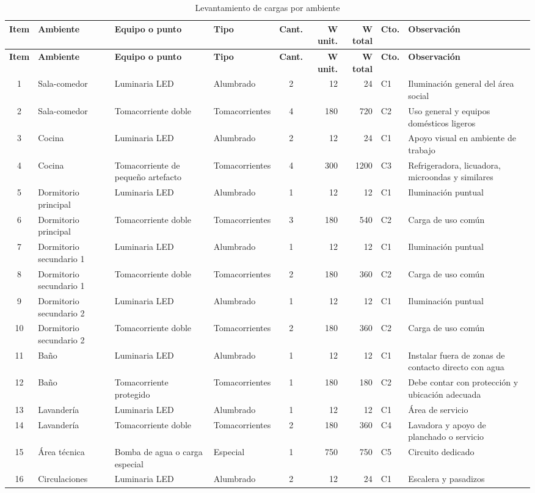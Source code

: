 \begin{landscape}
\scriptsize
\setlength{\tabcolsep}{3pt}
\begin{longtable}{c L{2.3cm} L{2.6cm} L{2.2cm} c r r L{1.0cm} L{2.4cm}}
\caption{Levantamiento de cargas por ambiente}\label{tab:levantamiento-cargas}\\
\toprule
\textbf{Item} & \textbf{Ambiente} & \textbf{Equipo o punto} & \textbf{Tipo} & \textbf{Cant.} & \textbf{W unit.} & \textbf{W total} & \textbf{Cto.} & \textbf{Observación} \\
\midrule
\endfirsthead
\toprule
\textbf{Item} & \textbf{Ambiente} & \textbf{Equipo o punto} & \textbf{Tipo} & \textbf{Cant.} & \textbf{W unit.} & \textbf{W total} & \textbf{Cto.} & \textbf{Observación} \\
\midrule
{} & Sala-comedor & Luminaria LED & Alumbrado & 2 & 12 & 24 & C1 & Iluminación general del área social \\
2 & Sala-comedor & Tomacorriente doble & Tomacorrientes & 4 & 180 & 720 & C2 & Uso general y equipos domésticos ligeros \\
3 & Cocina & Luminaria LED & Alumbrado & 2 & 12 & 24 & C1 & Apoyo visual en ambiente de trabajo \\
4 & Cocina & Tomacorriente de pequeño artefacto & Tomacorrientes & 4 & 300 & 1200 & C3 & Refrigeradora, licuadora, microondas y similares \\
5 & Dormitorio principal & Luminaria LED & Alumbrado & 1 & 12 & 12 & C1 & Iluminación puntual \\
6 & Dormitorio principal & Tomacorriente doble & Tomacorrientes & 3 & 180 & 540 & C2 & Carga de uso común \\
7 & Dormitorio secundario 1 & Luminaria LED & Alumbrado & 1 & 12 & 12 & C1 & Iluminación puntual \\
8 & Dormitorio secundario 1 & Tomacorriente doble & Tomacorrientes & 2 & 180 & 360 & C2 & Carga de uso común \\
9 & Dormitorio secundario 2 & Luminaria LED & Alumbrado & 1 & 12 & 12 & C1 & Iluminación puntual \\
10 & Dormitorio secundario 2 & Tomacorriente doble & Tomacorrientes & 2 & 180 & 360 & C2 & Carga de uso común \\
11 & Baño & Luminaria LED & Alumbrado & 1 & 12 & 12 & C1 & Instalar fuera de zonas de contacto directo con agua \\
12 & Baño & Tomacorriente protegido & Tomacorrientes & 1 & 180 & 180 & C2 & Debe contar con protección y ubicación adecuada \\
13 & Lavandería & Luminaria LED & Alumbrado & 1 & 12 & 12 & C1 & Área de servicio \\
14 & Lavandería & Tomacorriente doble & Tomacorrientes & 2 & 180 & 360 & C4 & Lavadora y apoyo de planchado o servicio \\
15 & Área técnica & Bomba de agua o carga especial & Especial & 1 & 750 & 750 & C5 & Circuito dedicado \\
16 & Circulaciones & Luminaria LED & Alumbrado & 2 & 12 & 24 & C1 & Escalera y pasadizos \\
\bottomrule
\end{longtable}
\end{landscape}

